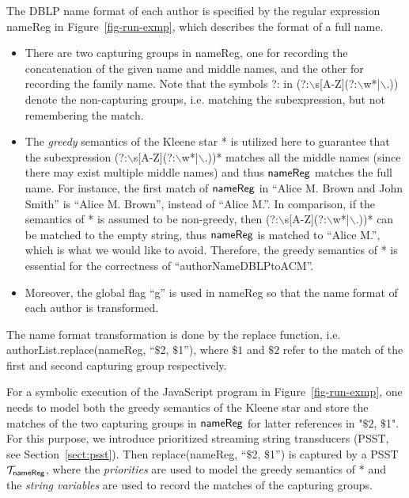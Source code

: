 The DBLP name format of each author is specified by the regular expression {\sf nameReg}  in Figure~\ref{fig-run-exmp}, which describes the format of a full name.
\begin{itemize}
\item There are two capturing groups in {\sf nameReg}, one for recording the concatenation of the given name and middle names, and the other for recording the family name. 
Note that the symbols ?: in (?:$\backslash$s[A-Z](?:$\backslash$w*|$\backslash$.)) denote the non-capturing groups, i.e. matching the subexpression, but not remembering the match.
%
\item The \emph{greedy} semantics of the Kleene star * is utilized here to guarantee that the subexpression (?:$\backslash$s[A-Z](?:$\backslash$w*|$\backslash$.))* matches all the middle names (since there may exist multiple middle names) and thus ${\sf nameReg}$ matches the full name. For instance, the first match of ${\sf nameReg}$ in  ``Alice M. Brown and John Smith'' is ``Alice M. Brown'', instead of ``Alice M.''. In comparison, if the semantics of * is assumed to be non-greedy, then (?:$\backslash$s[A-Z](?:$\backslash$w*|$\backslash$.))* can be matched to the empty string, thus ${\sf nameReg}$ is matched to ``Alice M.'', which is what we would like to avoid. Therefore, the greedy semantics of * is essential for the correctness of ``authorNameDBLPtoACM''.
%
\item Moreover, the global flag ``g'' is used in {\sf nameReg} so that the name format of each author is transformed. 
\end{itemize}
The name format transformation is done by the {\sf replace} function, i.e. {\sf authorList.replace(nameReg, ``$\$$2, $\$$1'')}, where $\$1$ and $\$2$ refer to the match of the first and second capturing group respectively. 

For a symbolic execution of the JavaScript program in Figure~\ref{fig-run-exmp}, one needs to model both the greedy semantics of the Kleene star and store the matches of the two capturing groups in ${\sf nameReg}$ for latter references in "$\$2$, $\$$1". For this purpose, we introduce prioritized streaming string transducers (PSST, see Section~\ref{sect:psst}). Then {\sf replace(nameReg, ``$\$$2, $\$$1'')} is captured by a PSST $\mathcal{T}_{\sf nameReg}$, where the \emph{priorities} are used to model the greedy semantics of $*$ and the \emph{string variables} are used to record the matches of the capturing groups.

